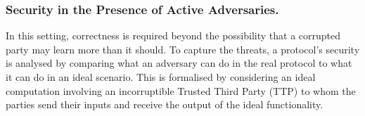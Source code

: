   \vspace{-4.5mm}
  
 \subsubsection{Security in the Presence of Active Adversaries.}  In this setting, correctness is required beyond the possibility that a corrupted party may learn more than it should. To capture the threats,
a protocol's security is analysed by comparing what an adversary can do in the real protocol to what it can do in an ideal scenario. This is formalised by considering an ideal computation involving an incorruptible Trusted Third Party (TTP) to whom the parties send their inputs and receive the output of the ideal functionality. %

%
%
%
% 
% 
% 
 
